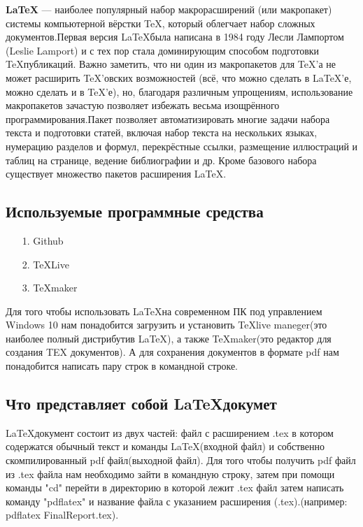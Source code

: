 \documentclass[14pt, a4paper]{extarticle}
\begin{document}
\textbf{\LaTeX} — наиболее популярный набор макрорасширений (или макропакет) системы компьютерной вёрстки \TeX, который облегчает набор сложных документов.Первая версия \LaTeX была написана в 1984 году Лесли Лампортом (Leslie Lamport) и с тех пор стала доминирующим способом подготовки \TeX публикаций. Важно заметить, что ни один из макропакетов для \TeX ’а не может расширить \TeX ’овских возможностей (всё, что можно сделать в LaTeX’е, можно сделать и в \TeX ’е), но, благодаря различным упрощениям, использование макропакетов зачастую позволяет избежать весьма изощрённого программирования.Пакет позволяет автоматизировать многие задачи набора текста и подготовки статей, включая набор текста на нескольких языках, нумерацию разделов и формул, перекрёстные ссылки, размещение иллюстраций и таблиц на странице, ведение библиографии и др. Кроме базового набора существует множество пакетов расширения \LaTeX.

\subsection{Используемые программные средства}
\begin{itemize}
\item[1.]Github

\item[2.]\TeX Live

\item[3.]\TeX maker
\end{itemize}
Для того чтобы использовать \LaTeX на современном ПК под управлением Windows 10 нам понадобится загрузить и установить \TeX live maneger(это наиболее полный дистрибутив \LaTeX), а также \TeX maker(это редактор для создания TEX документов). А для сохранения документов в формате pdf нам понадобится написать пару строк в командной строке.

\subsection{Что представляет собой \LaTeX докумет}
\LaTeX документ состоит из двух частей: файл с расширением .tex в котором содержатся обычный текст и команды \LaTeX(входной файл) и собственно скомпилированный pdf файл(выходной файл). Для того чтобы получить pdf файл из .tex файла нам необходимо зайти в командную строку, затем при помощи команды "cd" перейти в директорию в которой лежит .tex файл затем написать команду "pdflatex" и название файла с указанием расширения (.tex).(например: pdflatex FinalReport.tex). 
\end{document}
